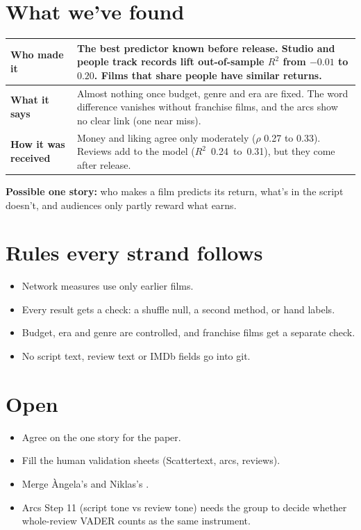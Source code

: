 \documentclass[10pt]{article}
\begin{document}
\section{What we've found}

\begin{tabularx}{\linewidth}{@{}>{\bfseries}p{3.2cm}L@{}}
\toprule
Who made it & The best predictor known before release. Studio and people track records lift out-of-sample $R^2$ from $-0.01$ to $0.20$. Films that share people have similar returns. \\
\midrule
What it says & Almost nothing once budget, genre and era are fixed. The word difference vanishes without franchise films, and the arcs show no clear link (one near miss). \\
\midrule
How it was received & Money and liking agree only moderately ($\rho$ 0.27 to 0.33). Reviews add to the model (\mbox{$R^2$ 0.24 to 0.31}), but they come after release. \\
\bottomrule
\end{tabularx}

\medskip
\textbf{Possible one story:} who makes a film predicts its return, what's in the script doesn't, and audiences
only partly reward what earns.

\section{Rules every strand follows}
\begin{itemize}
  \item Network measures use only earlier films.
  \item Every result gets a check: a shuffle null, a second method, or hand labels.
  \item Budget, era and genre are controlled, and franchise films get a separate check.
  \item No script text, review text or IMDb fields go into git.
\end{itemize}

\section{Open}
\begin{itemize}
  \item Agree on the one story for the paper.
  \item Fill the human validation sheets (Scattertext, arcs, reviews).
  \item Merge Àngela's  and Niklas's .
  \item Arcs Step 11 (script tone vs review tone) needs the group to decide whether whole-review VADER counts as the same instrument.
\end{itemize}
\end{document}
